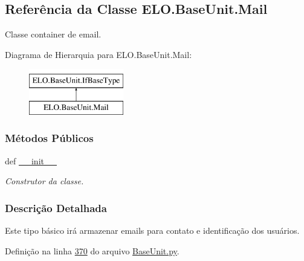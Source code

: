 \hypertarget{classELO_1_1BaseUnit_1_1Mail}{\subsection{Referência da Classe E\-L\-O.\-Base\-Unit.\-Mail}
\label{classELO_1_1BaseUnit_1_1Mail}
}


Classe container de email.  


Diagrama de Hierarquia para E\-L\-O.\-Base\-Unit.\-Mail\-:\begin{figure}[H]
\begin{center}
\leavevmode
\includegraphics[height=2.000000cm]{d5/db6/classELO_1_1BaseUnit_1_1Mail}
\end{center}
\end{figure}
\subsubsection*{Métodos Públicos}
\begin{DoxyCompactItemize}
\item 
def \hyperlink{classELO_1_1BaseUnit_1_1Mail_a7b9e31959dacc8c25ecae3e9bc0321aa}{\-\_\-\-\_\-init\-\_\-\-\_\-}
\begin{DoxyCompactList}\small\item\em Construtor da classe. \end{DoxyCompactList}\end{DoxyCompactItemize}


\subsubsection{Descrição Detalhada}
Este tipo básico irá armazenar emails para contato e identificação dos usuários. 

Definição na linha \hyperlink{BaseUnit_8py_source_l00370}{370} do arquivo \hyperlink{BaseUnit_8py_source}{Base\-Unit.\-py}.



